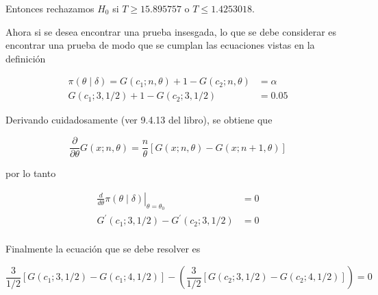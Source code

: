 \documentclass[
  12pt,
]{book}
\begin{document}
Entonces rechazamos \(H_0\) si \(T\geq 15.895757\) o \(T\leq 1.4253018\).

Ahora si se desea encontrar una prueba insesgada, lo que se debe considerar es encontrar una prueba de modo que se cumplan las ecuaciones vistas en la definición

\begin{align*}
\pi(\theta \mid \delta)=G\left(c_{1} ; n, \theta\right)+1-G\left(c_{2} ; n, \theta\right) &= \alpha \\
G\left(c_{1} ; 3,1 / 2\right)+1-G\left(c_{2} ; 3,1 / 2\right)&=0.05
\end{align*}

Derivando cuidadosamente (ver 9.4.13 del libro), se obtiene que

\begin{equation*}
\frac{\partial}{\partial \theta} G(x ; n, \theta)=\frac{n}{\theta}[G(x ; n, \theta)-G(x ; n+1, \theta)]
\end{equation*}

por lo tanto

\begin{align*}
\left.\frac{d}{d \theta} \pi(\theta \mid \delta)\right|_{\theta=\theta_{0}} &=0  \\
G^\prime(c_1; 3, 1/2) - G^\prime(c_2; 3, 1/2)  & = 0 \\
\end{align*}

Finalmente la ecuación que se debe resolver es

\begin{equation*}
\frac{3}{1/2}[G(c_1 ; 3,1/2)-G(c_1 ; 4,1/2)] -
\left(\frac{3}{1/2}[G(c_2 ; 3,1/2)-G(c_2 ; 4,1/2)]\right) =  0 
\end{equation*}
\end{document}

